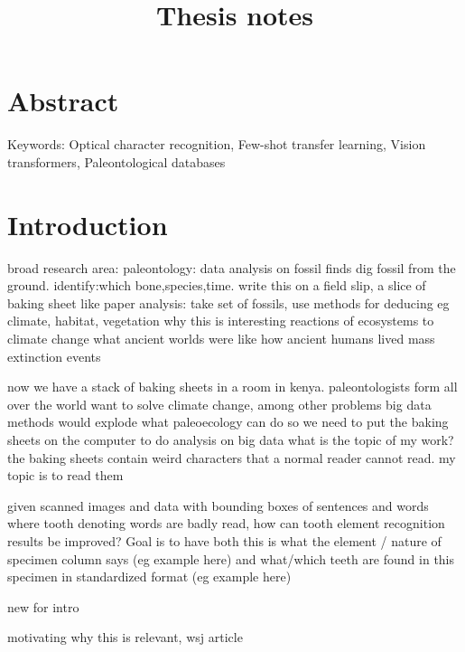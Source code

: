 \documentclass{article}
\title{Thesis notes}
\begin{document}
\tableofcontents

\section{Abstract}

Keywords: Optical character recognition, Few-shot transfer learning, Vision transformers, Paleontological databases

\section{Introduction}
 

broad research area: paleontology: data analysis on fossil finds
dig fossil from the ground. identify:which bone,species,time. write this on a field slip, a slice of
baking sheet like paper 
analysis: take set of fossils, use methods for deducing eg climate, habitat, vegetation
why this is interesting 
    reactions of ecosystems to climate change
    what ancient worlds were like 
    how ancient humans lived
    mass extinction events

now we have a stack of baking sheets in a room in kenya.
paleontologists form all over the world want to solve climate change, among other problems
big data methods would explode what paleoecology can do
so we need to put the baking sheets on the computer to do analysis on big data
what is the topic of my work?
the baking sheets contain weird characters that a normal reader cannot read.
my topic is to read them

given scanned images and data with bounding boxes of sentences and words where tooth denoting words are 
badly read, how can tooth element recognition results be improved? Goal is to have both this is what the element 
/ nature of specimen column says (eg example here) and what/which teeth are found in this specimen in standardized format
(eg example here)


new for intro 

motivating why this is relevant, wsj article \cite{hotzMuseumOverflowingPrehistoric2024}
\end{document}
